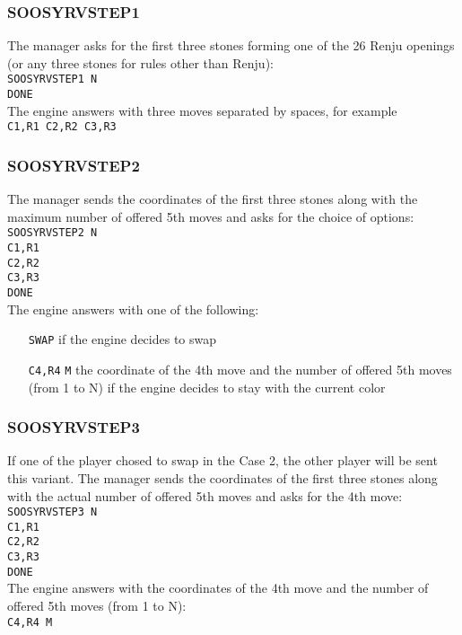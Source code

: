 \documentclass[12pt,a4paper]{article}
\begin{document}
\subsubsection{SOOSYRVSTEP1}
The manager asks for the first three stones forming one of the 26 Renju openings (or any three stones for rules other than Renju):\\
\texttt{SOOSYRVSTEP1 N}\\
\texttt{DONE}\\
The engine answers with three moves separated by spaces, for example\\
\texttt{C1,R1 C2,R2 C3,R3}

\subsubsection{SOOSYRVSTEP2}
The manager sends the coordinates of the first three stones along with the maximum number of offered 5th moves and asks for the choice of options:\\
\texttt{SOOSYRVSTEP2 N}\\
\texttt{C1,R1}\\
\texttt{C2,R2}\\
\texttt{C3,R3}\\
\texttt{DONE}\\
The engine answers with one of the following:
\begin{enumerate}[leftmargin=7.5em]
\item[\texttt{SWAP}]{if the engine decides to swap}
\item[\texttt{C4,R4} \texttt{M}]{the coordinate of the 4th move and the number of offered 5th moves (from 1 to N) if the engine decides to stay with the current color}
\end{enumerate}

\subsubsection{SOOSYRVSTEP3}
If one of the player chosed to swap in the Case 2, the other player will be sent this variant. The manager sends the coordinates of the first three stones along with the actual number of offered 5th moves and asks for the 4th move:\\
\texttt{SOOSYRVSTEP3 N}\\
\texttt{C1,R1}\\
\texttt{C2,R2}\\
\texttt{C3,R3}\\
\texttt{DONE}\\
The engine answers with the coordinates of the 4th move and the number of offered 5th moves (from 1 to N):\\
\texttt{C4,R4 \texttt{M}}
\end{document}
